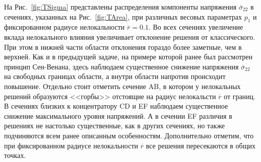 На Рис.~\ref{fig:TSigma} представлены распределения компоненты напряжения $\overline{\sigma}_{22}$ в сечениях, указанных на Рис.~\ref{fig:TArea}, при различных весовых параметрах $p_1$ и фиксированном радиусе нелокальности $\overline{r} = 0.1$. Во всех сечениях увеличение вклада нелокального влияния увеличивает отклонение решения от классического. При этом в нижней части области отклонения гораздо более заметные, чем в верхней. Как и в предыдущей задаче, на примере которой ранее был рассмотрен принцип Сен-Венана, здесь наблюдаем существенное снижение напряжения $\overline{\sigma}_{22}$ на свободных границах области, а внутри области напротив происходит повышение. Отдельно стоит отметить сечение AB, в котором у нелокальных решений образуются <<горбы>> отстоящие на радиус нелокальсти $\overline{r}$ от границ. В сечениях близких к концентратору CD и EF наблюдаем существенное снижение максимального уровня напряжений. А в сечении EF различия в решениях не настолько существенные, как в других сечениях, но также подчиняются всем ранее описанным особенностям. Дополнительно отметим, что при фиксированном радиусе нелокальности $\overline{r}$ все решения пересекаются в общих точках.

